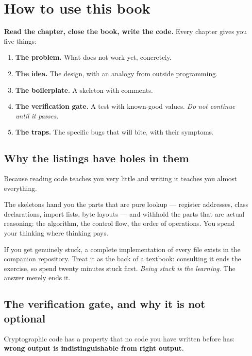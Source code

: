 \section*{How to use this book}
\label{sec:howtouse}

\textbf{Read the chapter, close the book, write the code.} Every chapter gives
you five things:

\begin{enumerate}
  \item \textbf{The problem.} What does not work yet, concretely.
  \item \textbf{The idea.} The design, with an analogy from outside programming.
  \item \textbf{The boilerplate.} A skeleton with  comments.
  \item \textbf{The verification gate.} A test with known-good values.
        \emph{Do not continue until it passes.}
  \item \textbf{The traps.} The specific bugs that will bite, with their symptoms.
\end{enumerate}

\subsection*{Why the listings have holes in them}

Because reading code teaches you very little and writing it teaches you almost
everything.

The skeletons hand you the parts that are pure lookup --- register addresses,
class declarations, import lists, byte layouts --- and withhold the parts that
are actual reasoning: the algorithm, the control flow, the order of operations.
You spend your thinking where thinking pays.

If you get genuinely stuck, a complete implementation of every file exists in
the companion repository. Treat it as the back of a textbook: consulting it ends
the exercise, so spend twenty minutes stuck first. \emph{Being stuck is the
learning.} The answer merely ends it.

\subsection*{The verification gate, and why it is not optional}

Cryptographic code has a property that no code you have written before has:
\textbf{wrong output is indistinguishable from right output.}

